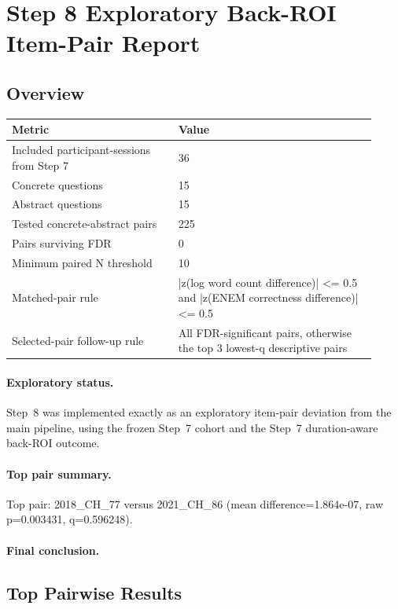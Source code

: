 \documentclass[11pt]{article}
\begin{document}
\section*{Step 8 Exploratory Back-ROI Item-Pair Report}
\subsection*{Overview}
\begin{tabular}{p{0.42\linewidth}p{0.50\linewidth}}
\toprule
Metric & Value\\
\midrule
Included participant-sessions from Step 7 & 36\\
Concrete questions & 15\\
Abstract questions & 15\\
Tested concrete-abstract pairs & 225\\
Pairs surviving FDR & 0\\
Minimum paired N threshold & 10\\
Matched-pair rule & |z(log word count difference)| <= 0.5 and |z(ENEM correctness difference)| <= 0.5\\
Selected-pair follow-up rule & All FDR-significant pairs, otherwise the top 3 lowest-q descriptive pairs\\
\bottomrule
\end{tabular}
\paragraph{Exploratory status.} Step~8 was implemented exactly as an exploratory item-pair deviation from the main pipeline, using the frozen Step~7 cohort and the Step~7 duration-aware back-ROI outcome.
\paragraph{Top pair summary.} Top pair: 2018\_CH\_77 versus 2021\_CH\_86 (mean difference=1.864e-07, raw p=0.003431, q=0.596248).
\paragraph{Final conclusion.} 
\subsection*{Top Pairwise Results}

\end{document}
